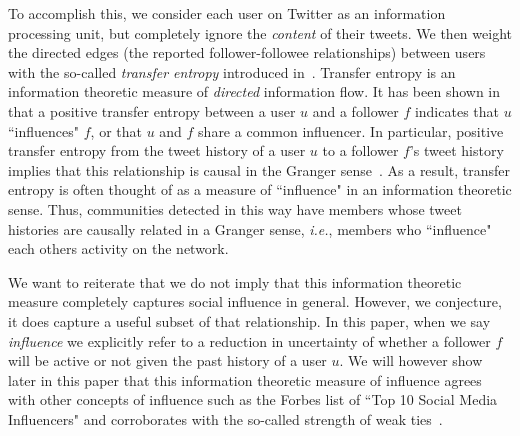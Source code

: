 To accomplish this, we consider each user on Twitter as an information processing unit, but completely ignore the \emph{content} of their tweets. We then weight the directed edges (the reported follower-followee relationships) between users with the so-called \emph{transfer entropy} introduced in~\cite{schreiber2000measuring}.  Transfer entropy is an information theoretic measure of \emph{directed} information flow. It has been shown in~\cite{ver2012information} that a positive transfer entropy between a user $u$ and a follower $f$ indicates that $u$ ``influences" $f$, or that $u$ and $f$ share a common influencer. In particular, positive transfer entropy from the tweet history of a user $u$ to a follower $f$'s tweet history implies that this relationship is causal in the Granger sense~\cite{granger1963economic}. As a result, transfer entropy is often thought of as a measure of ``influence" in an information theoretic sense.  Thus, communities detected in this way have members whose tweet histories are causally related in a Granger sense, \emph{i.e.}, members who ``influence" each others activity on the network.

We want to reiterate that we do not imply that this information theoretic measure completely captures social influence in general. However, we conjecture, it does capture a useful subset of that relationship. In this paper, when we say \emph{influence} we explicitly refer to a reduction in uncertainty of whether a follower $f$ will be active or not given the past history of a user $u$. We will however show later in this paper that this information theoretic measure of influence agrees with other concepts of influence such as the Forbes list of ``Top 10 Social Media Influencers" and corroborates with the so-called strength of weak ties~\cite{granovetter1973strength}.



